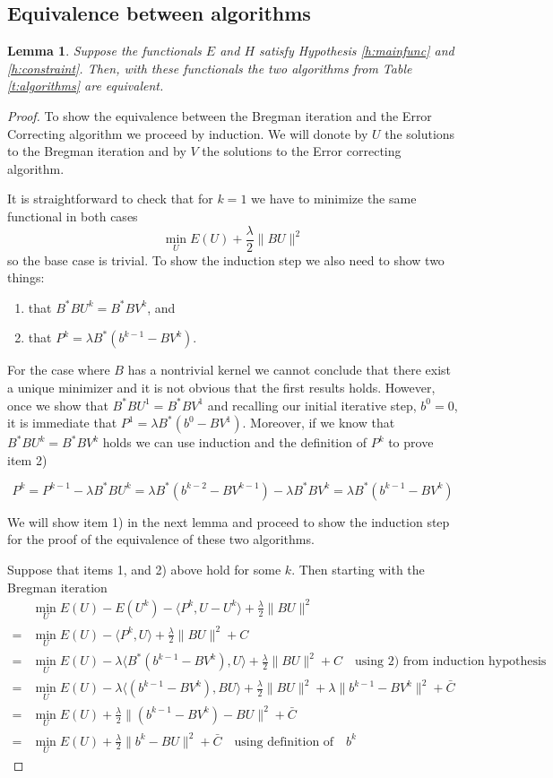 \documentclass[11pt]{article}
\theoremstyle{plain}
\newtheorem{Lemma}{Lemma}[section]
\begin{document}
\subsection{Equivalence between algorithms}
\begin{Lemma}
Suppose the functionals $E$ and $H$ satisfy Hypothesis \ref{h:mainfunc} and \ref{h:constraint}. Then, with these functionals the two algorithms from Table \ref{t:algorithms} are equivalent.
\end{Lemma}
\begin{proof}

To show the equivalence between the Bregman iteration and the Error Correcting algorithm we proceed by induction. We will donote by $U$ the solutions to the Bregman iteration and by $V$ the solutions to the Error correcting algorithm.

It is straightforward to check that for $k=1$ we have to minimize the same functional in both cases 
\[ \min_U E(U) + \frac{\lambda}{2} \| BU\|^2\]
so the base case is trivial. To show the induction step we also need to show two things:
 \begin{enumerate}
 \item that $B^*BU^k = B^*BV^k$, and 
 \item that $P^k = \lambda B^*(b^{k-1} - BV^k)$.
 \end{enumerate}
For the case where $B$ has a nontrivial kernel we cannot conclude that there exist a unique minimizer and it is not obvious that the first results holds. However, once we show that $B^*BU^1 = B^*BV^1$ and recalling our initial iterative step, $b^0=0$, it is immediate that $P^1 = \lambda B^*(b^0 - BV^1)$. Moreover, if we know that $B^*BU^k = B^*BV^k$ holds we can use induction and the definition of $P^{k}$ to prove item 2)

\[  P^k = P^{k-1} - \lambda B^*BU^k   =  \lambda B^*(b^{k-2} - BV^{k-1}) - \lambda B^*BV^k  =  \lambda B^*(b^{k-1} - BV^k)\]


We will show item 1) in the next lemma  and proceed to show the induction step for the proof of the equivalence of these two algorithms. 

Suppose that items 1, and 2) above hold for some $k$. Then starting with the Bregman iteration
\begin{align*}
& \min_U E(U) - E(U^k) - \langle P^k, U - U^k \rangle + \frac{\lambda}{2} \|BU\|^2 \\
=& \min_U E(U) - \langle P^k, U \rangle + \frac{\lambda}{2} \|BU\|^2 + C\\
=& \min_U E(U) - \lambda \langle B^*( b^{k-1} - BV^k ) ,  U \rangle + \frac{\lambda}{2} \|BU\|^2 + C\quad \mbox{using 2) from induction hypothesis} \\ 
=&\min_U E(U) - \lambda \langle ( b^{k-1} - BV^k ) , BU \rangle + \frac{\lambda}{2}\|BU\|^2 + \lambda \|  b^{k-1} - BV^k \|^2 +  \bar{C}\\
=&\min_U E(U) + \frac{\lambda}{2} \|  ( b^{k-1} - BV^k) - BU \|^2 +  \bar{C}\\
=&\min_U E(U) + \frac{\lambda}{2} \|  b^k- BU \|^2 +  \bar{C}\quad \mbox{using definition of} \quad b^k 
\end{align*}


\end{proof}
\end{document}
